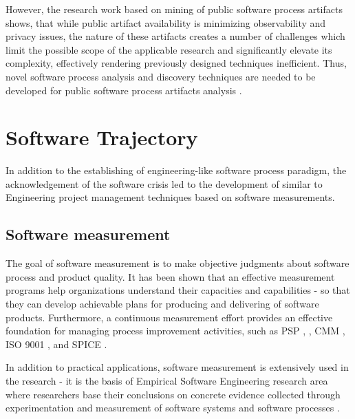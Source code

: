 However, the research work based on mining of public software process artifacts shows, that while public 
artifact availability is minimizing observability and privacy issues, the nature of these artifacts creates a number of 
challenges which limit the possible scope of the applicable research and significantly elevate its complexity, 
effectively rendering previously designed techniques inefficient.
Thus, novel software process analysis and discovery techniques are needed to be developed for public software 
process artifacts analysis \cite{citeulike:7853299}.

%
%
\section{Software Trajectory}\label{section_software_trajectory}
In addition to the establishing of engineering-like software process paradigm, the acknowledgement of 
the software crisis led to the development of similar to Engineering project management techniques based on 
software measurements.

\subsection{Software measurement}
The goal of software measurement is to make objective judgments about software process and product quality. 
It has been shown that an effective measurement programs help organizations understand their capacities and 
capabilities - so that they can develop achievable plans for producing and delivering of software products. 
Furthermore, a continuous measurement effort provides an effective foundation for managing process 
improvement activities, such as PSP \cite{citeulike:8347315}, \cite{citeulike:5090131} 
\cite{citeulike:12929216}, CMM \cite{citeulike:9962021}, ISO 9001 \cite{iso-standard}, 
and SPICE \cite{spice-standard}.

In addition to practical applications, software measurement is extensively used in the research - it is the basis of 
Empirical Software Engineering research area where researchers base their conclusions on concrete evidence collected 
through experimentation and measurement of software systems and software processes \cite{citeulike:766768}.

